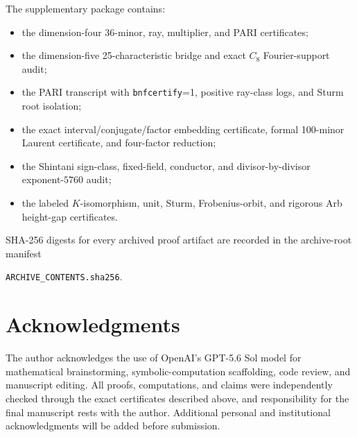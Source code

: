 \documentclass[11pt]{article}
\begin{document}
The supplementary package contains:
\begin{itemize}
\item the dimension-four $36$-minor, ray, multiplier, and PARI
  certificates;
\item the dimension-five 25-characteristic bridge and exact
  $C_8$ Fourier-support audit;
\item the PARI transcript with \texttt{bnfcertify}=1, positive
  ray-class logs, and Sturm root isolation;
\item the exact interval/conjugate/factor embedding certificate,
  formal 100-minor Laurent certificate, and four-factor reduction;
\item the Shintani sign-class, fixed-field, conductor, and
  divisor-by-divisor exponent-$5760$ audit;
\item the labeled $K$-isomorphism, unit, Sturm, Frobenius-orbit,
  and rigorous Arb height-gap certificates.
\end{itemize}
SHA-256 digests for every archived proof artifact are recorded in the
archive-root manifest
\begin{center}
\texttt{ARCHIVE\_CONTENTS.sha256}.
\end{center}

\section*{Acknowledgments}

The author acknowledges the use of OpenAI's GPT-5.6 Sol model for
mathematical brainstorming, symbolic-computation scaffolding, code
review, and manuscript editing.  All proofs, computations, and claims
were independently checked through the exact certificates described
above, and responsibility for the final manuscript rests with the
author.  Additional personal and institutional acknowledgments will be
added before submission.
\end{document}
